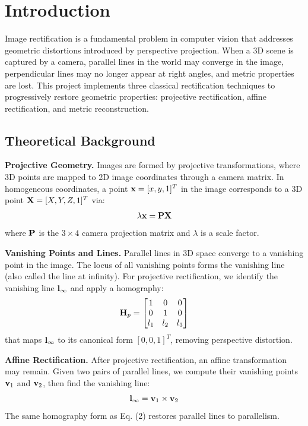 \section{Introduction}

Image rectification is a fundamental problem in computer vision that addresses geometric distortions introduced by perspective projection. When a 3D scene is captured by a camera, parallel lines in the world may converge in the image, perpendicular lines may no longer appear at right angles, and metric properties are lost. This project implements three classical rectification techniques to progressively restore geometric properties: projective rectification, affine rectification, and metric reconstruction.

\subsection{Theoretical Background}

\textbf{Projective Geometry.} Images are formed by projective transformations, where 3D points are mapped to 2D image coordinates through a camera matrix. In homogeneous coordinates, a point $\mathbf{x} = [x, y, 1]^T$ in the image corresponds to a 3D point $\mathbf{X} = [X, Y, Z, 1]^T$ via:
\begin{equation}
    \lambda \mathbf{x} = \mathbf{P} \mathbf{X}
\end{equation}
where $\mathbf{P}$ is the $3 \times 4$ camera projection matrix and $\lambda$ is a scale factor.

\textbf{Vanishing Points and Lines.} Parallel lines in 3D space converge to a vanishing point in the image. The locus of all vanishing points forms the vanishing line (also called the line at infinity). For projective rectification, we identify the vanishing line $\mathbf{l}_\infty$ and apply a homography:
\begin{equation}
    \mathbf{H}_p = \begin{bmatrix} 1 & 0 & 0 \\ 0 & 1 & 0 \\ l_1 & l_2 & l_3 \end{bmatrix}
\end{equation}
that maps $\mathbf{l}_\infty$ to its canonical form $[0, 0, 1]^T$, removing perspective distortion.

\textbf{Affine Rectification.} After projective rectification, an affine transformation may remain. Given two pairs of parallel lines, we compute their vanishing points $\mathbf{v}_1$ and $\mathbf{v}_2$, then find the vanishing line:
\begin{equation}
    \mathbf{l}_\infty = \mathbf{v}_1 \times \mathbf{v}_2
\end{equation}
The same homography form as Eq. (2) restores parallel lines to parallelism.


